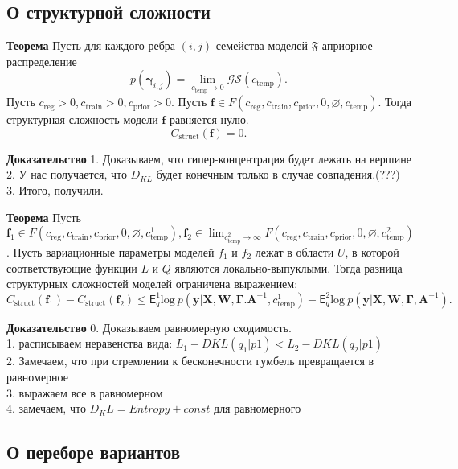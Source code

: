 \documentclass[12pt]{article}
\begin{document}
\subsection{О структурной сложности}
\textbf{Теорема}
Пусть для каждого ребра $(i,j)$ семейства моделей $\mathfrak{F}$ априорное распределение $$p(\boldsymbol{\gamma}_{i,j}) =  \lim_{c_{\text{temp}} \to 0} \mathcal{GS}(c_{\text{temp}}).$$
Пусть $c_{\text{reg}} >0, c_{\text{train}} >0, c_{\text{prior}}>0$.
Пусть $\mathbf{f} \in F(c_{\text{reg}}, c_{\text{train}}, c_{\text{prior}}, 0, \varnothing, c_{\text{temp}})$.
Тогда структурная сложность модели $\mathbf{f}$ равняется нулю.
\[
    C_\text{struct}(\mathbf{f}) = 0.
\]
    
\textbf{Доказательство}
1. Доказываем, что гипер-концентрация будет лежать на вершине\\
2. У нас получается, что $D_{KL}$ будет конечным только в случае совпадения.(???)
3. Итого, получили.

\textbf{Теорема}
Пусть $\mathbf{f}_1 \in F(c_{\text{reg}}, c_{\text{train}},  c_{\text{prior}}, 0, \varnothing,  c^1_{\text{temp}}), \mathbf{f}_2   \in \lim_{c^2_{\text{temp}} \to \infty} F(c_{\text{reg}}, c_{\text{train}},  c_{\text{prior}}, 0, \varnothing,  c^2_{\text{temp}})$.
Пусть вариационные параметры моделей $f_1$ и $f_2$ лежат в области $U$, в которой соответствующие функции $L$ и $Q$ являются локально-выпуклыми. 
Тогда разница структурных сложностей моделей ограничена выражением:
\[
    C_\text{struct}(\mathbf{f}_1)  - C_\text{struct}(\mathbf{f}_2) \leq {\mathsf{E}_q^1 \text{log}~{p(\mathbf{y} | \mathbf{X}, \mathbf{W}, \boldsymbol{\Gamma}. \mathbf{A}^{-1}, c^1_{\text{temp}})}} - {\mathsf{E}_q^2 \text{log}~{p(\mathbf{y} | \mathbf{X}, \mathbf{W}, \boldsymbol{\Gamma}, \mathbf{A}^{-1})}}.
\]

\textbf{Доказательство}
0. Доказываем равномерную сходимость.\\
1. расписываем неравенства вида: $L_1 - DKL(q_1|p1) <L_2 - DKL(q_2|p1)$\\
2. Замечаем, что при стремлении к бесконечности гумбель превращается в равномерное\\
3. выражаем все в равномерном\\
4. замечаем, что $D_KL = Entropy + const$ для равномерного




\subsection{О переборе вариантов}
\end{document}
